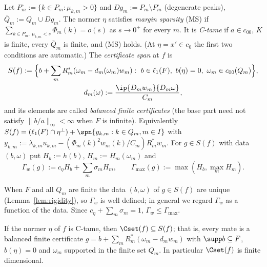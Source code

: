 \begin{definition}\label{def:tame}
Let $P^\circ_m:=\{k\in P_m:\mu_{k,m}>0\}$ and $Dg_m:=P_m\setminus P_m^\circ$
(degenerate peaks), $\bar Q_m:=Q_m\cup Dg_m$.  The normer $\eta$ satisfies
\emph{margin sparsity} \textup{(MS)} if
$\sum_{k\in P_m^\circ,\ \mu_{k,m}<s}\Phi_m(k)=o(s)$ as $s\to0^+$ for every
$m$.  It is \emph{C-tame} if $a\in c_{00}$, $K$ is finite, every
$\bar Q_m$ is finite, and \textup{(MS)} holds.  (At $\eta=x'\in c_0$ the
first two conditions are automatic.)  The \emph{certificate span} at $f$ is
\begin{gather*}
 S(f):=\Big\{b+\sum_mR_m^*(\omega_m-d_m(\omega_m)w_m):\ b\in\ell_1(F),\
 b(\eta)=0,\ \omega_m\in c_{00}(Q_m)\Big\},\\
 d_m(\omega):=\frac{\ip{D_mw_m}{D_m\omega}}{C_m},
\end{gather*}
and its elements are called \emph{balanced finite certificates} (the base
part need not satisfy $\|b/a\|_\infty<\infty$ when $F$ is infinite).
Equivalently
$S(f)=(\ell_1(F)\cap\eta^\perp)+\spn\{y_{k,m}:k\in Q_m,m\in I\}$ with
$y_{k,m}:=\lambda_{k,m}u_{k,m}-(\Phi_m(k)^2w_m(k)/C_m)R_m^*w_m$.  For
$g\in S(f)$ with data $(b,\omega)$ put $H_b:=h(b)$, $H_m:=H_m(\omega_m)$ and
\[
 \Gamma_w(g):=c_\eta H_b+\sum_m\sigma_mH_m,\qquad
 \Gamma_{\max}(g):=\max(H_b,\max_mH_m).
\]
\end{definition}

When $F$ and all $Q_m$ are finite the data $(b,\omega)$ of $g\in S(f)$ are
unique (Lemma~\ref{lem:rigidity}), so $\Gamma_w$ is well defined; in general
we regard $\Gamma_w$ as a function of the data.  Since $c_\eta+\sum_m
\sigma_m=1$, $\Gamma_w\le\Gamma_{\max}$.

\begin{theorem}\label{thm:tamefibre}
If the normer $\eta$ of $f$ is C-tame, then $\Cset(f)\subseteq S(f)$; that
is, every mate is a balanced finite certificate
$g=b+\sum_mR_m^*(\omega_m-d_mw_m)$ with $\supp b\subseteq F$, $b(\eta)=0$
and $\omega_m$ supported in the finite set $Q_m$.  In particular
$\Cset(f)$ is finite dimensional.
\end{theorem}


